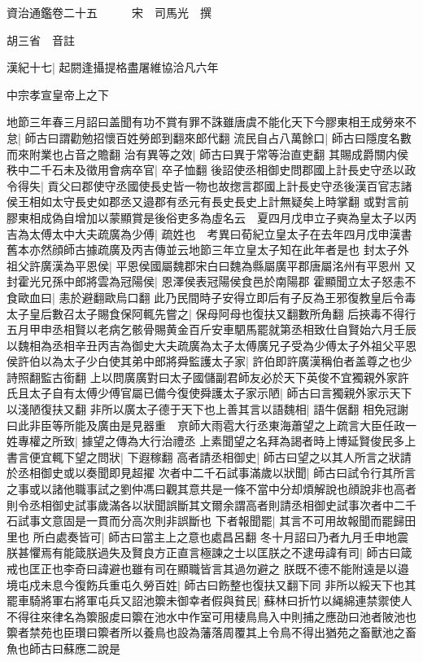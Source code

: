 資治通鑑卷二十五　　　宋　司馬光　撰

胡三省　音註

漢紀十七|{
	起閼逢攝提格盡屠維協洽凡六年}


中宗孝宣皇帝上之下

地節三年春三月詔曰盖聞有功不賞有罪不誅雖唐虞不能化天下今膠東相王成勞來不怠|{
	師古曰謂勸勉招懷百姓勞郎到翻來郎代翻}
流民自占八萬餘口|{
	師古曰隱度名數而來附業也占音之贍翻}
治有異等之效|{
	師古曰異于常等治直吏翻}
其賜成爵關内侯秩中二千石未及徵用會病卒官|{
	卒子恤翻}
後詔使丞相御史問郡國上計長史守丞以政令得失|{
	貢父曰郡使守丞國使長史皆一物也故揔言郡國上計長史守丞後漢百官志諸侯王相如太守長史如郡丞又邉郡有丞元有長史長史上計無疑矣上時掌翻}
或對言前膠東相成偽自增加以蒙顯賞是後俗吏多為虛名云　夏四月戊申立子奭為皇太子以丙吉為太傅太中大夫疏廣為少傅|{
	疏姓也　考異曰荀紀立皇太子在去年四月戊申漢書舊本亦然顔師古據疏廣及丙吉傳並云地節三年立皇太子知在此年者是也}
封太子外祖父許廣漢為平恩侯|{
	平恩侯國屬魏郡宋白曰魏為縣屬廣平郡唐屬洺州有平恩州}
又封霍光兄孫中郎將雲為冠陽侯|{
	恩澤侯表冠陽侯食邑於南陽郡}
霍顯聞立太子怒恚不食歐血曰|{
	恚於避翻歐烏口翻}
此乃民間時子安得立即后有子反為王邪復教皇后令毒太子皇后數召太子賜食保阿輒先嘗之|{
	保母阿母也復扶又翻數所角翻}
后挾毒不得行　五月甲申丞相賢以老病乞骸骨賜黄金百斤安車駟馬罷就第丞相致仕自賢始六月壬辰以魏相為丞相辛丑丙吉為御史大夫疏廣為太子太傅廣兄子受為少傅太子外祖父平恩侯許伯以為太子少白使其弟中郎將舜監護太子家|{
	許伯即許廣漢稱伯者盖尊之也少詩照翻監古銜翻}
上以問廣廣對曰太子國儲副君師友必於天下英俊不宜獨親外家許氏且太子自有太傅少傅官屬已備今復使舜護太子家示陋|{
	師古曰言獨親外家示天下以淺陋復扶又翻}
非所以廣太子德于天下也上善其言以語魏相|{
	語牛倨翻}
相免冠謝曰此非臣等所能及廣由是見器重　亰師大雨雹大行丞東海蕭望之上疏言大臣任政一姓專權之所致|{
	據望之傳為大行治禮丞}
上素聞望之名拜為謁者時上博延賢俊民多上書言便宜輒下望之問狀|{
	下遐稼翻}
高者請丞相御史|{
	師古曰望之以其人所言之狀請於丞相御史或以奏聞即見超擢}
次者中二千石試事滿歲以狀聞|{
	師古曰試令行其所言之事或以諸他職事試之劉仲馮曰觀其意共是一條不當中分却煩解說也顔說非也高者則令丞相御史試事歲滿各以狀聞誤斷其文爾余謂高者則請丞相御史試事次者中二千石試事文意固是一貫而分高次則非誤斷也}
下者報聞罷|{
	其言不可用故報聞而罷歸田里也}
所白處奏皆可|{
	師古曰當主上之意也處昌呂翻}
冬十月詔曰乃者九月壬申地震朕甚懼焉有能箴朕過失及賢良方正直言極諫之士以匡朕之不逮毋諱有司|{
	師古曰箴戒也匡正也李奇曰諱避也雖有司在顯職皆言其過勿避之}
朕既不德不能附遠是以邉境屯戍未息今復飭兵重屯久勞百姓|{
	師古曰飭整也復扶又翻下同}
非所以綏天下也其罷車騎將軍右將軍屯兵又詔池籞未御幸者假與貧民|{
	蘇林曰折竹以䋲綿連禁禦使人不得往來律名為籞服䖍曰籞在池水中作室可用棲鳥鳥入中則捕之應劭曰池者陂池也籞者禁苑也臣瓚曰籞者所以養鳥也設為藩落周覆其上令鳥不得出猶苑之畜獸池之畜魚也師古曰蘇應二說是}
